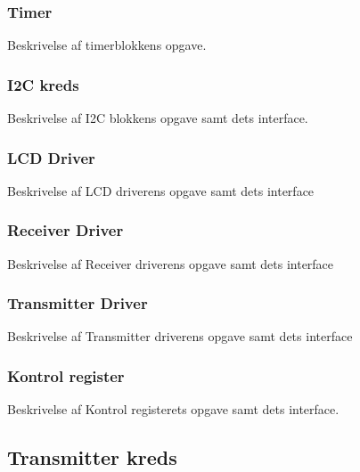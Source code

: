 \subsubsection{Timer}
Beskrivelse af timerblokkens opgave.
\subsubsection{I2C kreds}
Beskrivelse af I2C blokkens opgave samt dets interface.
\subsubsection{LCD Driver}
Beskrivelse af LCD driverens opgave samt dets interface
\subsubsection{Receiver Driver}
Beskrivelse af Receiver driverens opgave samt dets interface
\subsubsection{Transmitter Driver}
Beskrivelse af Transmitter driverens opgave samt dets interface
\subsubsection{Kontrol register}
Beskrivelse af Kontrol registerets opgave samt dets interface.

\subsection{Transmitter kreds}

